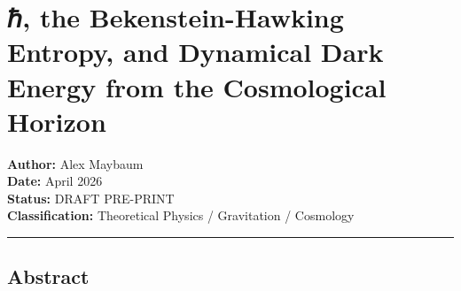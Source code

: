 \documentclass[
]{article}
\author{}
\date{}
\begin{document}
\hypertarget{ux210f-the-bekenstein-hawking-entropy-and-dynamical-dark-energy-from-the-cosmological-horizon}{%
\section{ℏ, the Bekenstein-Hawking Entropy, and Dynamical Dark Energy
from the Cosmological
Horizon}\label{ux210f-the-bekenstein-hawking-entropy-and-dynamical-dark-energy-from-the-cosmological-horizon}}

\textbf{Author:} Alex Maybaum\\
\textbf{Date:} April 2026\\
\textbf{Status:} DRAFT PRE-PRINT\\
\textbf{Classification:} Theoretical Physics / Gravitation / Cosmology

\begin{center}\rule{0.5\linewidth}{0.5pt}\end{center}

\hypertarget{abstract}{%
\subsection{Abstract}\label{abstract}}
\end{document}

